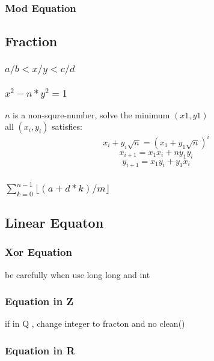 \documentclass[a4paper,5pt,twocolumn,titlepage]{article}
\begin{document}
\begin{CJK*}{GBK}{song}
        \subsubsection{Mod Equation}
             
    \subsection{Fraction}
        \subsubsection{$a/b < x/y < c/d$}
         
         \subsubsection{$x^2 - n*y^2 = 1$}
         $n$ is a non-squre-number, solve the minimum $(x1,y1)$\\
         all $(x_i,y_i)$ satisfies:
         $$x_i + y_i\sqrt n = (x_1 + y_1\sqrt n)^i$$
         $$x_{i+1} = x_1x_i + ny_1y_i$$
         $$y_{i+1} = x_1y_i + y_1x_i$$
         
         \subsubsection{$\sum_{k=0}^{n-1}\lfloor (a+d*k)/m \rfloor$}
         
    \subsection{Linear Equaton}
        \subsubsection{Xor Equation}
            
            be carefully when use long long and int
            
        \subsubsection{Equation in Z}
        if in Q , change integer to fracton and no clean()
            
        \subsubsection{Equation in R}
            

\end{CJK*}
\end{document}
